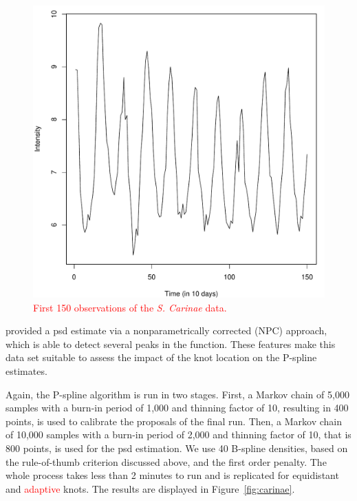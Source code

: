 \documentclass[twocolumn,final]{svjour3}
\begin{document}
\begin{figure}[]
	\centering
	\includegraphics[scale=0.4,clip=true,angle=0]{carinae_data.pdf}
	\caption{ \textcolor{red}{First 150 observations of the \textit{S. Carinae} data.}}
	\label{fig:carinae_data}
\end{figure}

\cite{Kirch:2018} provided a psd estimate via a nonparametrically corrected (NPC) approach, which is able to detect several peaks in the function.  These features make this data set suitable to assess the impact of the knot location on the P-spline estimates. 

Again, the P-spline algorithm is run in two stages.  First, a Markov chain of 5,000 samples with a burn-in period of 1,000 and thinning factor of 10, resulting in 400 points, is used to calibrate the proposals of the final run.  Then, a Markov chain of 10,000 samples with a burn-in period of 2,000 and thinning factor of 10, that is 800 points, is used for the psd estimation.  We use 40 B-spline densities,  based on the rule-of-thumb criterion discussed above, and the first order penalty.  The whole process takes less than 2 minutes to run and is replicated for equidistant and \textcolor{red}{adaptive} knots. The results are displayed in Figure~\ref{fig:carinae}.
\end{document}
